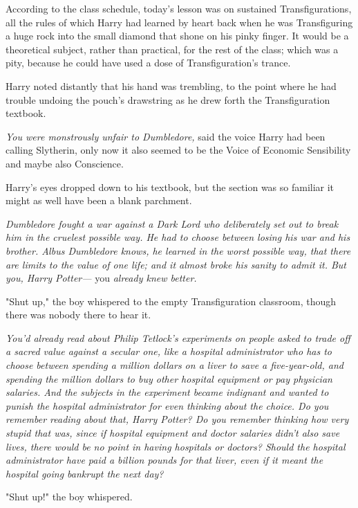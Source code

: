 According to the class schedule, today's lesson was on sustained
Transfigurations, all the rules of which Harry had learned by heart back when
he was Transfiguring a huge rock into the small diamond that shone on his pinky
finger. It would be a theoretical subject, rather than practical, for the rest
of the class; which was a pity, because he could have used a dose of
Transfiguration's trance.

Harry noted distantly that his hand was trembling, to the point where he had
trouble undoing the pouch's drawstring as he drew forth the Transfiguration
textbook.

\emph{You were monstrously unfair to Dumbledore,} said the voice Harry had been
calling Slytherin, only now it also seemed to be the Voice of Economic
Sensibility and maybe also Conscience.

Harry's eyes dropped down to his textbook, but the section was so familiar it
might as well have been a blank parchment.

\emph{Dumbledore fought a war against a Dark Lord who deliberately set out to
break him in the cruelest possible way. He had to choose between losing his war
and his brother. Albus Dumbledore knows, he learned in the worst possible way,
that there are limits to the value of one life; and it almost broke his sanity
to admit it. But you, Harry Potter—} you \emph{already knew better.}

"Shut up," the boy whispered to the empty Transfiguration classroom, though
there was nobody there to hear it.

\emph{You'd already read about Philip Tetlock's experiments on people asked to
trade off a sacred value against a secular one, like a hospital administrator
who has to choose between spending a million dollars on a liver to save a
five-year-old, and spending the million dollars to buy other hospital equipment
or pay physician salaries. And the subjects in the experiment became indignant
and wanted to punish the hospital administrator for even thinking about the
choice. Do you remember reading about that, Harry Potter? Do you remember
thinking how very stupid that was, since if hospital equipment and doctor
salaries didn't also save lives, there would be no point in having hospitals or
doctors? Should the hospital administrator have paid a billion pounds for that
liver, even if it meant the hospital going bankrupt the next day?}

"Shut up!" the boy whispered.

